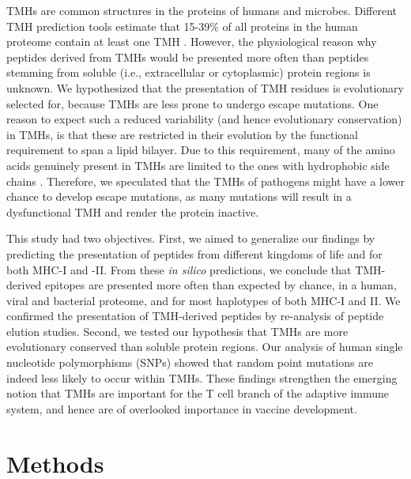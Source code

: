 TMHs are common structures in the proteins of humans and microbes. 
Different TMH prediction tools estimate that 15-39\% of all proteins 
in the human proteome contain at least one TMH \cite{ahram2006estimation}.
However, the physiological reason why peptides derived from TMHs 
would be presented more often than peptides 
stemming from soluble (i.e., extracellular or cytoplasmic) protein regions is unknown. 
We hypothesized that the presentation of 
TMH residues is evolutionary selected for, 
because TMHs are less prone to undergo escape mutations. 
One reason to expect such a reduced 
variability (and hence evolutionary conservation) in TMHs, 
is that these are restricted in their evolution 
by the functional requirement to span a lipid bilayer. 
Due to this requirement, 
many of the amino acids genuinely present in TMHs 
are limited to the ones with hydrophobic side chains 
\cite{hessa2007molecular,jones1994model}.
Therefore, we speculated that the TMHs of pathogens 
might have a lower chance to develop escape mutations, 
as many mutations will result in a dysfunctional TMH 
and render the protein inactive.

This study had two objectives. 
First, we aimed to generalize our findings by predicting the presentation of peptides 
from different kingdoms of life and for both MHC-I and -II. 
From these \emph{in silico} predictions, we conclude that TMH-derived
epitopes are presented more often than expected by chance,
in a human, viral and bacterial proteome, 
and for most haplotypes of both MHC-I and II. 
We confirmed the presentation of TMH-derived peptides 
by re-analysis of peptide elution studies. 
Second, we tested our hypothesis that TMHs 
are more evolutionary conserved than soluble protein regions. 
Our analysis of human single nucleotide polymorphisms (SNPs) showed 
that random point mutations are indeed less likely
to occur within TMHs. 
These findings strengthen the emerging notion 
that TMHs are important for the T cell branch of the adaptive immune system, 
and hence are of  
overlooked importance in vaccine development.

\section{Methods}

